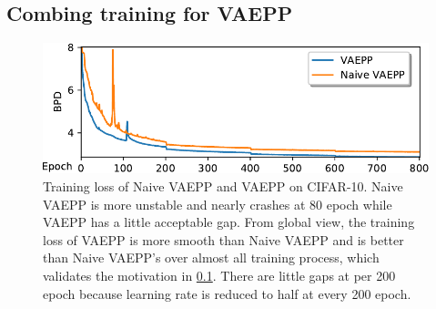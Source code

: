 \subsection{Combing training for VAEPP} \label{subsec:improve_of_vaepp}

\begin{figure}[tb]
	\centering
	\includegraphics[width=0.9\columnwidth]{../dist.strip/loss_curves}
	\caption{
	Training loss of Naive VAEPP and VAEPP on CIFAR-10. Naive VAEPP is more unstable and nearly crashes at 80 epoch while VAEPP has a little acceptable gap. From global view, the training loss of VAEPP is more smooth than Naive VAEPP and is better than Naive VAEPP's over almost all training process, which validates the motivation in \cref{subsec:improve_of_vaepp}. There are little gaps at per 200 epoch because learning rate is reduced to half at every 200 epoch. 
	}
	\label{fig:loss_curves}
\end{figure}

